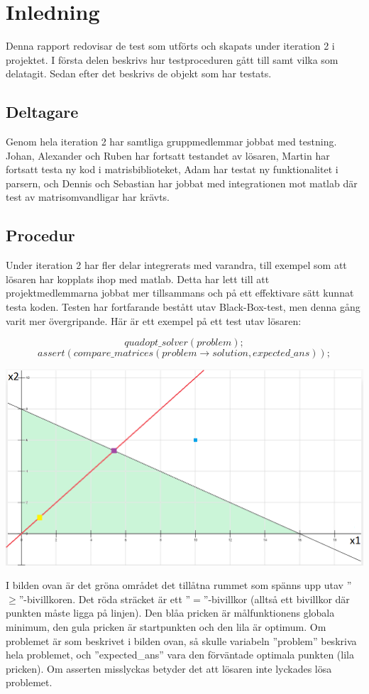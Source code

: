 \section{Inledning}
Denna rapport redovisar de test som utförts och skapats under iteration 2 i projektet. I första delen beskrivs hur testproceduren gått till samt vilka som delatagit. Sedan efter det beskrivs de objekt som har testats.
\subsection{Deltagare}
Genom hela iteration 2 har samtliga gruppmedlemmar jobbat med testning. Johan, Alexander och Ruben har fortsatt testandet av lösaren, Martin har fortsatt testa ny kod i matrisbiblioteket, Adam har testat ny funktionalitet i parsern, och Dennis och Sebastian har jobbat med integrationen mot matlab där test av matrisomvandligar har krävts. 

\subsection{Procedur}
Under iteration 2 har fler delar integrerats med varandra, till exempel som att lösaren har kopplats ihop med matlab. Detta har lett till att projektmedlemmarna jobbat mer tillsammans och på ett effektivare sätt kunnat testa koden. Testen har fortfarande bestått utav Black-Box-test, men denna gång varit mer övergripande. Här är ett exempel på ett test utav lösaren:

$$quadopt\_solver(problem);$$
$$assert(compare\_matrices(problem\rightarrow solution, expected\_ans));$$

\includegraphics[scale=0.6]{prob.png}


\raggedright I bilden ovan är det gröna området det tillåtna rummet som spänns upp utav ''$\geq$''-bivillkoren. Det röda sträcket är ett ''$=$''-bivillkor (alltså ett bivillkor där punkten måste ligga på linjen). Den blåa pricken är målfunktionens globala minimum, den gula pricken är startpunkten och den lila är optimum. \newline
Om problemet är som beskrivet i bilden ovan, så skulle variabeln ''problem'' beskriva hela problemet, och ''expected\_ans'' vara den förväntade optimala punkten (lila pricken). Om asserten misslyckas betyder det att lösaren inte lyckades lösa problemet.

